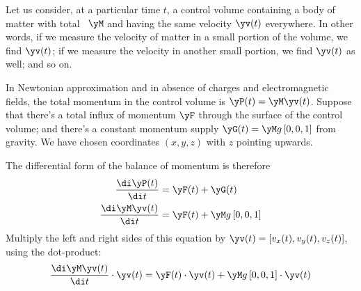 \label{sec:workenergy_thm}

Let us consider, at a particular time $t$, a control volume containing a body of matter with total \masse\ $\yM$ and having the same velocity $\yv(t)$ everywhere. In other words, if we measure the velocity of matter in a small portion of the volume, we find $\yv(t)$; if we measure the velocity in another small portion, we find $\yv(t)$ as well; and so on.

In Newtonian approximation and in absence of charges and electromagnetic fields, the total momentum in the control volume is $\yP(t)=\yM\yv(t)$. Suppose that there's a total influx of momentum $\yF$ through the surface of the control volume; and there's a constant momentum supply $\yG(t) = \yM g\, [0,0,1]$ from gravity. We have chosen coordinates $(x,y,z)$ with $z$ pointing upwards.

The differential form of the balance of momentum is therefore
\begin{equation*}
  \begin{aligned}[b]
    \frac{\di\yP(t)}{\di t} &= \yF(t) + \yG(t)
\\
    \frac{\di\yM \yv(t)}{\di t} &= \yF(t) + \yM g\, [0,0,1]
  \end{aligned}
\end{equation*}
Multiply the left and right sides of this equation by $\yv(t) = [v_{x}(t), v_{y}(t), v_{z}(t)]$, using the dot-product:
\begin{equation}
    \label{eq:balance_mom_wethm}
  \frac{\di\yM \yv(t)}{\di t} \cdot \yv(t) = \yF(t)\cdot \yv(t) + \yM g\, [0,0,1]\cdot \yv(t)
\end{equation}

